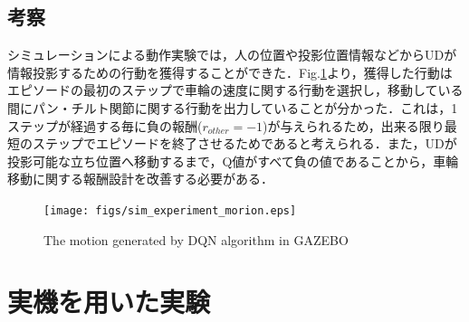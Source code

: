 \documentclass[12pt]{sonota/aislab}
\begin{document}


\subsection{考察}
シミュレーションによる動作実験では，人の位置や投影位置情報などからUDが情報投影するための行動を獲得することができた．Fig.\ref{sim_experiment_motion}より，獲得した行動はエピソードの最初のステップで車輪の速度に関する行動を選択し，移動している間にパン・チルト関節に関する行動を出力していることが分かった．これは，1ステップが経過する毎に負の報酬($r_{other}=-1$)が与えられるため，出来る限り最短のステップでエピソードを終了させるためであると考えられる．また，UDが投影可能な立ち位置へ移動するまで，Q値がすべて負の値であることから，車輪移動に関する報酬設計を改善する必要がある．

\begin{figure}[t]
\begin{center}
\texttt{[image: figs/sim\_experiment\_morion.eps]}
\caption{The motion generated by DQN algorithm in GAZEBO}
\label{sim_experiment_motion}
\end{center}
\end{figure}

\clearpage

\section{実機を用いた実験}
\end{document}
